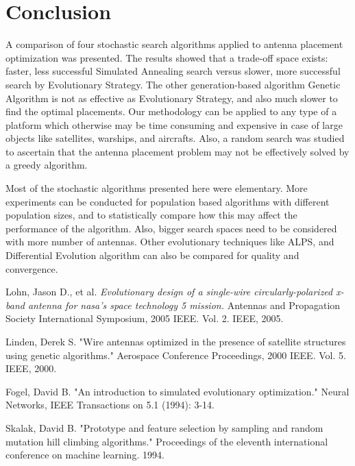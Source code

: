 \documentclass[conference]{IEEEtran}
\begin{document}
\section{Conclusion}
A comparison of four stochastic search algorithms applied to antenna placement optimization was presented. The results showed that a trade-off space exists: faster, less successful Simulated Annealing search versus slower, more successful search by Evolutionary Strategy. The other generation-based algorithm Genetic Algorithm is not as effective as Evolutionary Strategy, and also much slower to find the optimal placements. Our methodology can be applied to any type of a platform which otherwise may be time consuming and expensive in case of large objects like satellites, warships, and aircrafts. Also, a random search was studied to ascertain that the antenna placement problem may not be effectively solved by a greedy algorithm.

Most of the stochastic algorithms presented here were elementary. More experiments can be conducted for population based algorithms with different population sizes, and to statistically compare how this may affect the performance of the algorithm. Also, bigger search spaces need to be considered with more number of antennas. Other evolutionary techniques like ALPS, and Differential Evolution algorithm can also be compared for quality and convergence.

\begin{thebibliography}{1}

Lohn, Jason D., et al. \emph{Evolutionary design of a single-wire circularly-polarized x-band antenna for nasa's space technology 5 mission.} Antennas and Propagation Society International Symposium, 2005 IEEE. Vol. 2. IEEE, 2005.

Linden, Derek S. "Wire antennas optimized in the presence of satellite structures using genetic algorithms." Aerospace Conference Proceedings, 2000 IEEE. Vol. 5. IEEE, 2000.

Fogel, David B. "An introduction to simulated evolutionary optimization." Neural Networks, IEEE Transactions on 5.1 (1994): 3-14.

Skalak, David B. "Prototype and feature selection by sampling and random mutation hill climbing algorithms." Proceedings of the eleventh international conference on machine learning. 1994.
\end{thebibliography}
\end{document}
